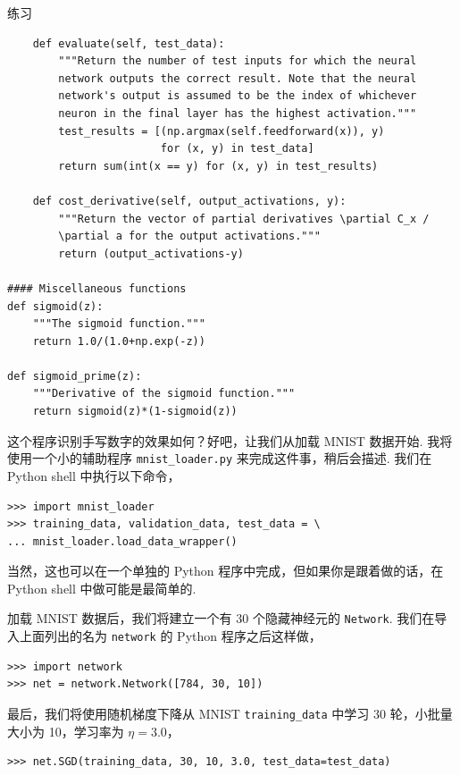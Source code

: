 \begin{exerciseBox}{练习}
\begin{lstlisting}
    def evaluate(self, test_data):
        """Return the number of test inputs for which the neural
        network outputs the correct result. Note that the neural
        network's output is assumed to be the index of whichever
        neuron in the final layer has the highest activation."""
        test_results = [(np.argmax(self.feedforward(x)), y)
                        for (x, y) in test_data]
        return sum(int(x == y) for (x, y) in test_results)

    def cost_derivative(self, output_activations, y):
        """Return the vector of partial derivatives \partial C_x /
        \partial a for the output activations."""
        return (output_activations-y)

#### Miscellaneous functions
def sigmoid(z):
    """The sigmoid function."""
    return 1.0/(1.0+np.exp(-z))

def sigmoid_prime(z):
    """Derivative of the sigmoid function."""
    return sigmoid(z)*(1-sigmoid(z))

\end{lstlisting}

这个程序识别手写数字的效果如何？好吧，让我们从加载 MNIST 数据开始. 我将使用一个小的辅助程序 \texttt{mnist\_\allowbreak{}loader.py} 来完成这件事，稍后会描述. 我们在 Python shell 中执行以下命令，

\begin{lstlisting}
>>> import mnist_loader
>>> training_data, validation_data, test_data = \
... mnist_loader.load_data_wrapper()

\end{lstlisting}

当然，这也可以在一个单独的 Python 程序中完成，但如果你是跟着做的话，在 Python shell 中做可能是最简单的.

加载 MNIST 数据后，我们将建立一个有 $30$ 个隐藏神经元的 \texttt{Network}. 我们在导入上面列出的名为 \texttt{network} 的 Python 程序之后这样做，

\begin{lstlisting}
>>> import network
>>> net = network.Network([784, 30, 10])

\end{lstlisting}

最后，我们将使用随机梯度下降从 MNIST \texttt{training\_\allowbreak{}data} 中学习 30 轮，小批量大小为 10，学习率为 $\eta = 3.0$，

\begin{lstlisting}
>>> net.SGD(training_data, 30, 10, 3.0, test_data=test_data)


\end{lstlisting}
\end{exerciseBox}
